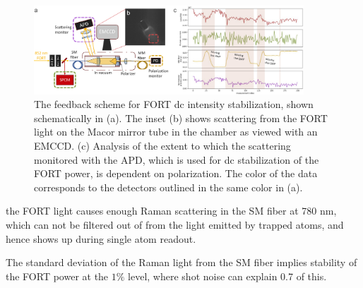 \begin{figure}[!ht]
    \centering
    \includegraphics[width=0.9\textwidth]{Images/FORT_feedback.pdf}
    \caption{The feedback scheme for FORT dc intensity stabilization, shown schematically in (a). The inset (b) shows scattering from the FORT light on the Macor mirror tube in the chamber as viewed with an EMCCD. (c) Analysis of the extent to which the scattering monitored with the APD, which is used for dc stabilization of the FORT power, is dependent on polarization. The color of the data corresponds to the detectors outlined in the same color in (a).}
    \label{fig:FORTfeedback}
\end{figure}

the FORT light causes enough Raman scattering in the SM fiber at 780 nm, which can not be filtered out of from the light emitted by trapped atoms, and hence shows up during single atom readout.

The standard deviation of the Raman light from the SM fiber implies stability of the FORT power at the $1\%$ level, where shot noise can explain 0.7 of this. 




